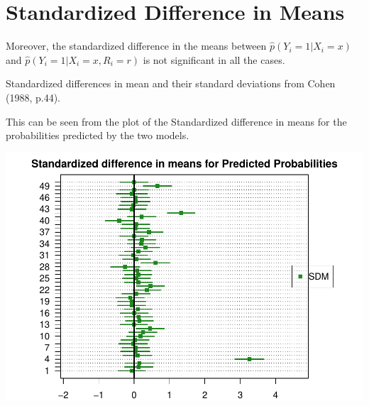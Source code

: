 \documentclass[]{article}
\newenvironment{Shaded}{\begin{snugshade}}{\end{snugshade}}
\newcommand{\CommentTok}[1]{\textcolor[rgb]{0.56,0.35,0.01}{\textit{#1}}}
\newcommand{\DecValTok}[1]{\textcolor[rgb]{0.00,0.00,0.81}{#1}}
\newcommand{\FloatTok}[1]{\textcolor[rgb]{0.00,0.00,0.81}{#1}}
\newcommand{\KeywordTok}[1]{\textcolor[rgb]{0.13,0.29,0.53}{\textbf{#1}}}
\newcommand{\NormalTok}[1]{#1}
\newcommand{\OperatorTok}[1]{\textcolor[rgb]{0.81,0.36,0.00}{\textbf{#1}}}
\newcommand{\StringTok}[1]{\textcolor[rgb]{0.31,0.60,0.02}{#1}}
\begin{document}
\hypertarget{standardized-difference-in-means}{%
\section{Standardized Difference in
Means}\label{standardized-difference-in-means}}

Moreover, the standardized difference in the means between
\(\hat{p}(Y_i =1 |X_i = x)\) and \(\hat{p}(Y_i = 1|X_i = x, R_i = r)\)
is not significant in all the cases.

Standardized differences in mean and their standard deviations from
Cohen (1988, p.44).

\begin{Shaded}
\end{Shaded}

This can be seen from the plot of the Standardized difference in means
for the probabilities predicted by the two models.

\includegraphics{sensitivity_analysis_files/figure-latex/unnamed-chunk-12-1.pdf}
\end{document}

